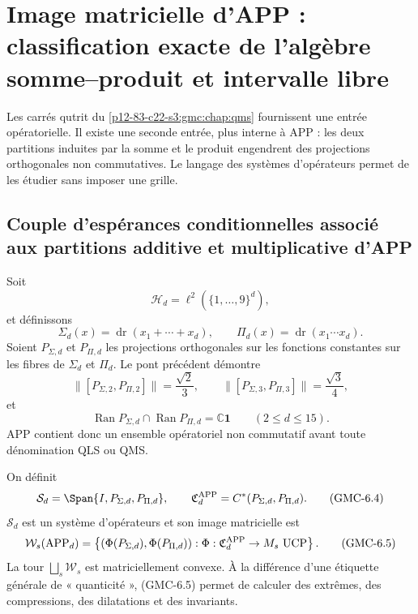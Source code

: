 \ifdefined\HMTGMCOperatorialAPP
\section[Image matricielle d'APP]{Image matricielle d'APP : classification exacte
de l'algèbre somme--produit et intervalle libre}
\label{p12-83-c22-s1:gmc:chap:operatorios}

Les carrés qutrit du \cref{p12-83-c22-s3:gmc:chap:qms} fournissent une entrée
opératorielle. Il existe une
seconde entrée, plus interne à APP : les deux partitions induites par la somme et le
produit engendrent des projections orthogonales non commutatives. Le langage des
systèmes d'opérateurs permet de les étudier sans imposer une grille.

\subsection{Couple d'espérances conditionnelles associé aux partitions additive et multiplicative d'APP}

Soit
\[
 \mathcal H_d=\ell^2(\{1,\ldots,9\}^d),
\]
et définissons
\[
 \Sigma_d(x)=\operatorname{dr}(x_1+\cdots+x_d),
 \qquad
 \Pi_d(x)=\operatorname{dr}(x_1\cdots x_d).
 \tag{GMC-6.1}
\]
Soient $P_{\Sigma,d}$ et $P_{\Pi,d}$ les projections orthogonales sur les
fonctions constantes sur les fibres de $\Sigma_d$ et $\Pi_d$. Le pont
précédent démontre
\[
 \|[P_{\Sigma,2},P_{\Pi,2}]\|=\frac{\sqrt2}{3},
 \qquad
 \|[P_{\Sigma,3},P_{\Pi,3}]\|=\frac{\sqrt3}{4},
 \tag{GMC-6.2}
\]
et
\[
 \operatorname{Ran}P_{\Sigma,d}\cap
 \operatorname{Ran}P_{\Pi,d}=\mathbb C\mathbf1
 \qquad(2\le d\le15).
 \tag{GMC-6.3}
\]
APP contient donc un ensemble opératoriel non commutatif avant
toute dénomination QLS ou QMS.

On définit
\[
 \mathcal S_d=\Span\{I,P_{\Sigma,d},P_{\Pi,d}\},
 \qquad
 \mathfrak C_d^{\rm APP}=C^*(P_{\Sigma,d},P_{\Pi,d}).
 \tag{GMC-6.4}
\]
$\mathcal S_d$ est un système d'opérateurs et son image matricielle est
\[
 \mathcal W_s(\mathrm{APP}_d)=
 \left\{(\Phi(P_{\Sigma,d}),\Phi(P_{\Pi,d})):
 \Phi:\mathfrak C_d^{\rm APP}\to M_s\ \text{UCP}\right\}.
 \tag{GMC-6.5}
\]
La tour $\bigsqcup_s\mathcal W_s$ est matriciellement convexe. À la différence d'une
étiquette générale de « quanticité », \textup{(GMC-6.5)} permet de calculer des extrêmes,
des compressions, des dilatations et des invariants.

